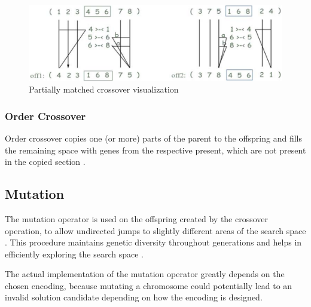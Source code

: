 \documentclass[sigconf]{acmart}
\begin{document}
\begin{figure}[h]
  \includegraphics[scale=0.14]{assets/partially-matched-crossover.png}
  \caption{Partially matched crossover visualization \cite{Katoch2021}}
\end{figure}


\subsubsection{Order Crossover}
Order crossover copies one (or more) parts of the parent to the offspring
and fills the remaining space with genes from the respective present, which
are not present in the copied section \cite{Katoch2021}.



\subsection{Mutation}
The mutation operator is used on the offspring created by the crossover
operation, to allow undirected jumps to slightly different areas of the search
space \cite{Affenzeller2009}. This procedure maintains genetic diversity
throughout generations and helps in efficiently exploring the search space
\cite{Katoch2021, Affenzeller2009}.

The actual implementation of the mutation operator greatly depends on the chosen
encoding, because mutating a chromosome could potentially lead to an invalid
solution candidate depending on how the encoding is designed.
\end{document}
